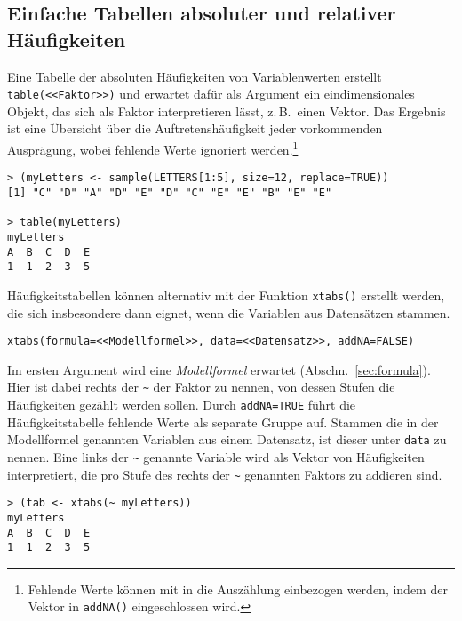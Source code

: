 \subsection{Einfache Tabellen absoluter und relativer Häufigkeiten}

Eine Tabelle der absoluten Häufigkeiten von Variablenwerten erstellt \lstinline!table(<<Faktor>>)! und erwartet dafür als Argument ein eindimensionales Objekt, das sich als Faktor interpretieren lässt, z.\,B.\ einen Vektor. Das Ergebnis ist eine Übersicht über die Auftretenshäufigkeit jeder vorkommenden Ausprägung, wobei fehlende Werte ignoriert werden.\footnote{Fehlende Werte können mit in die Auszählung einbezogen werden, indem der Vektor in \lstinline!addNA()! eingeschlossen wird.}
\begin{lstlisting}
> (myLetters <- sample(LETTERS[1:5], size=12, replace=TRUE))
[1] "C" "D" "A" "D" "E" "D" "C" "E" "E" "B" "E" "E"

> table(myLetters)
myLetters
A  B  C  D  E
1  1  2  3  5
\end{lstlisting}

Häufigkeitstabellen können alternativ mit der Funktion \lstinline!xtabs()! erstellt werden, die sich insbesondere dann eignet, wenn die Variablen aus Datensätzen stammen.
\begin{lstlisting}
xtabs(formula=<<Modellformel>>, data=<<Datensatz>>, addNA=FALSE)
\end{lstlisting}

Im ersten Argument wird eine \emph{Modellformel} erwartet (Abschn.\ \ref{sec:formula}). Hier ist dabei rechts der \lstinline!~! der Faktor zu nennen, von dessen Stufen die Häufigkeiten gezählt werden sollen. Durch \lstinline!addNA=TRUE! führt die Häufigkeitstabelle fehlende Werte als separate Gruppe auf. Stammen die in der Modellformel genannten Variablen aus einem Datensatz, ist dieser unter \lstinline!data! zu nennen. Eine links der \lstinline!~! genannte Variable wird als Vektor von Häufigkeiten interpretiert, die pro Stufe des rechts der \lstinline!~! genannten Faktors zu addieren sind.
\begin{lstlisting}
> (tab <- xtabs(~ myLetters))
myLetters
A  B  C  D  E 
1  1  2  3  5
\end{lstlisting}

